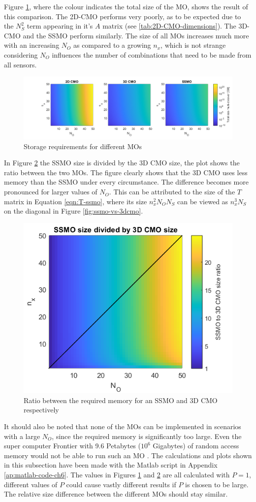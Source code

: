 Figure \ref{fig:MO-storage}, where the colour indicates the total size of the MO, shows the result of this comparison. The 2D-CMO performs very poorly, as to be expected due to the $N_S^2$ term appearing in it's $A$ matrix (see \autoref{tab:2D-CMO-dimensions}). The 3D-CMO and the SSMO perform similarly. The size of all MOs increases much more with an increasing $N_O$ as compared to a growing $n_x$, which is not strange considering $N_O$ influences the number of combinations that need to be made from all sensors.
\begin{figure}[H]
    \centering
    \includegraphics[width=\linewidth]{report/Figures/sizeComparison60.png}
    \caption{Storage requirements for different MOs}
    \label{fig:MO-storage}
\end{figure}
In Figure \ref{fig:ssmo-vs-3dcmo} the SSMO size is divided by the 3D CMO size, the plot shows the ratio between the two MOs. The figure clearly shows that the 3D CMO uses less memory than the SSMO under every circumstance. The difference becomes more pronounced for larger values of $N_O$. This can be attributed to the size of the $T$ matrix in Equation \ref{eqn:T-ssmo}, where its size $n_x^2N_ON_S$ can be viewed as $n_x^3N_S$ on the diagonal in Figure \eqref{fig:ssmo-vs-3dcmo}.
\begin{figure}[H]
    \centering
    \includegraphics[width=0.4\linewidth]{report/Figures/ssmo_vs_3dcmo.png}
    \caption{Ratio between the required memory for an SSMO and 3D CMO respectively}
    \label{fig:ssmo-vs-3dcmo}
\end{figure}
It should also be noted that none of the MOs can be implemented in scenarios with a large $N_O$, since the required memory is significantly too large. Even the super computer Frontier with 9.6 Petabytes ($10^6$ Gigabytes) of random access memory would not be able to run such an MO \cite{2024FrontierDocumentation}. The calculations and plots shown in this subsection have been made with the Matlab script in Appendix \ref{ap:matlab-code-ch6}. The values in Figures \ref{fig:MO-storage} and \ref{fig:ssmo-vs-3dcmo} are all calculated with $P=1$, different values of $P$ could cause vastly different results if $P$ is chosen to be large. The relative size difference between the different MOs should stay similar.